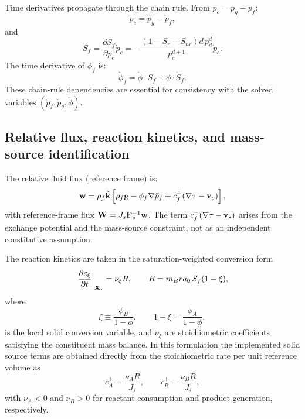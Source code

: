 \documentclass[11pt]{article}
\begin{document}
Time derivatives propagate through the chain rule. From $p_c = p_g - p_f$:
\begin{equation}
\dot p_c = \dot p_g - \dot p_f,
\label{eq:pc_rate}
\end{equation}
and 
\begin{equation}
\dot S_f = \frac{\partial S_f}{\partial p_c}\dot p_c = -\frac{(1-S_r-S_{nr})d\,p_d^d}{p_c^{d+1}}\dot p_c.
\label{eq:Sf_rate}
\end{equation}
The time derivative of $\phi_f$ is:
\begin{equation}
\dot\phi_f = \dot\phi \cdot S_f + \phi \cdot \dot S_f.
\label{eq:phi_f_rate}
\end{equation}
These chain-rule dependencies are essential for consistency with the solved variables $(\dot p_f, \dot p_g, \dot\phi)$.

\subsection{Relative flux, reaction kinetics, and mass-source identification}

The relative fluid flux (reference frame) is:
\begin{equation}
\mathbf{w}=\rho_f\tilde{\mathbf{k}}\left[\rho_f\mathbf{g}-\phi_f\nabla \bar p_f + c_f^+(\nabla\tau-\mathbf{v}_s)\right],
\label{eq:darcy_flux}
\end{equation}
with reference-frame flux $\mathbf{W}=J_s\mathbf{F}_s^{-1}\mathbf{w}$. The term $c_f^+(\nabla\tau-\mathbf{v}_s)$ arises from the exchange potential and the mass-source constraint, not as an independent constitutive assumption.

The reaction kinetics are taken in the saturation-weighted conversion form
\begin{equation}
\left.\frac{\partial c_\xi}{\partial t}\right|_{\mathbf{X}_s}=\nu_\xi R, \qquad R=m_B r a_0 \, S_f(1-\xi),
\label{eq:reaction_rate}
\end{equation}
where
\begin{equation}
  \xi \equiv \frac{\phi_B}{1-\phi},
  \qquad
  1-\xi = \frac{\phi_A}{1-\phi},
\end{equation}
is the local solid conversion variable, and $\nu_\xi$ are stoichiometric coefficients satisfying the constituent mass balance. In this formulation the implemented solid source terms are obtained directly from the stoichiometric rate per unit reference volume as
\begin{equation}
  c_A^+ = \frac{\nu_A R}{J_s}, \qquad c_B^+ = \frac{\nu_B R}{J_s},
\label{eq:c_AB_from_kinetics}
\end{equation}
with $\nu_A<0$ and $\nu_B>0$ for reactant consumption and product generation, respectively.
\end{document}
